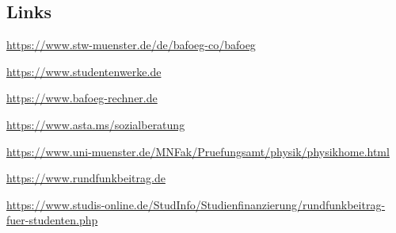 \begin{multicols*}{2}
\subsection{Links}
\begin{flushleft}
	\footnotesize
	\begin{fibelurl}
		\label{geld:bmbf}
	\end{fibelurl}
	\begin{fibelurl}
		\url{https://www.stw-muenster.de/de/bafoeg-co/bafoeg}
		\label{geld:studierendenwerk-ms}
	\end{fibelurl}
	\begin{fibelurl}
		\url{https://www.studentenwerke.de}
		\label{geld:studentenwerke}
	\end{fibelurl}
	\begin{fibelurl}
		\url{https://www.bafoeg-rechner.de}
		\label{geld:bafoeg-rechner}
	\end{fibelurl}
	\begin{fibelurl}
		\url{https://www.asta.ms/sozialberatung}
		\label{geld:asta_sozialberatung}
	\end{fibelurl}
	\begin{fibelurl}
		\url{https://www.uni-muenster.de/MNFak/Pruefungsamt/physik/physikhome.html}
		\label{geld:pa_physik}
	\end{fibelurl}
	\begin{fibelurl}
		\url{https://www.rundfunkbeitrag.de}
		\label{geld:rundfunkbeitrag}
	\end{fibelurl}
	\begin{fibelurl}
		\url{https://www.studis-online.de/StudInfo/Studienfinanzierung/rundfunkbeitrag-fuer-studenten.php}
		\label{geld:rundfunkbeitrag_studenten}
	\end{fibelurl}
\end{flushleft}

\end{multicols*}
